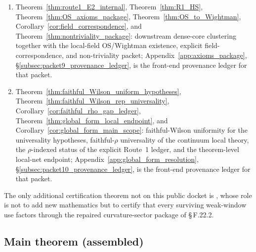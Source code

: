 \begin{enumerate}[label=\textbf{Packet \arabic*:},leftmargin=3.35em]
\item Theorem~\ref{thm:route1_E2_internal}, Theorem~\ref{thm:R1_HS}, Theorem~\ref{thm:OS_axioms_package}, Theorem~\ref{thm:OS_to_Wightman}, Corollary~\ref{cor:field_correspondence}, and Theorem~\ref{thm:nontriviality_package}: downstream dense-core clustering together with the local-field OS/Wightman existence, explicit field-correspondence, and non-triviality packet; Appendix~\ref{app:axioms_package}, \S\ref{subsec:packet9_provenance_ledger}, is the front-end provenance ledger for that packet.
\item Theorem~\ref{thm:faithful_Wilson_uniform_hypotheses}, Theorem~\ref{thm:faithful_Wilson_rep_universality}, Corollary~\ref{cor:faithful_rho_gap_ledger}, Theorem~\ref{thm:global_form_local_endpoint}, and Corollary~\ref{cor:global_form_main_scope}: faithful-Wilson uniformity for the universality hypotheses, faithful-$\rho$ universality of the continuum local theory, the $\rho$-indexed status of the explicit Route~1 ledger, and the theorem-level local-net endpoint; Appendix~\ref{app:global_form_resolution}, \S\ref{subsec:packet10_provenance_ledger}, is the front-end provenance ledger for that packet.
\end{enumerate}
The only additional certification theorem not on this public docket is , whose role is not to add new mathematics but to certify that every surviving weak-window use factors through the repaired curvature-sector package of \S\,F.22.2.

\subsection{Main theorem (assembled)}

